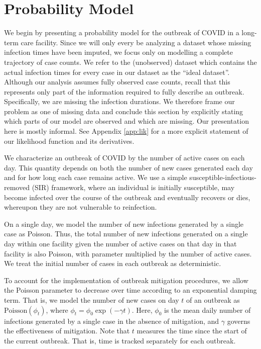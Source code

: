 \documentclass[11pt, oneside]{article}   	%
\begin{document}
\section{Probability Model}
\label{sec:model}


We begin by presenting a probability model for the outbreak of COVID in a long-term care facility. Since we will only every be analyzing a dataset whose missing infection times have been imputed, we focus only on modelling a complete trajectory of case counts. We refer to the (unobserved) dataset which contains the actual infection times for every case in our dataset as the ``ideal dataset''. Although our analysis assumes fully observed case counts, recall that this represents only part of the information required to fully describe an outbreak. Specifically, we are missing the infection durations. We therefore frame our problem as one of missing data and conclude this section by explicitly stating which parts of our model are observed and which are missing. Our presentation here is mostly informal. See Appendix \ref{app:lik} for a more explicit statement of our likelihood function and its derivatives.

We characterize an outbreak of COVID by the number of active cases on each day. This quantity depends on both the number of new cases generated each day and for how long each case remains active. We use a simple susceptible-infectious-removed (SIR) framework, where an individual is initially susceptible, may become infected over the course of the outbreak and eventually recovers or dies, whereupon they are not vulnerable to reinfection. 

On a single day, we model the number of new infections generated by a single case as Poisson. Thus, the total number of new infections generated on a single day within one facility given the number of active cases on that day in that facility is also Poisson, with parameter multiplied by the number of active cases. We treat the initial number of cases in each outbreak as deterministic.

To account for the implementation of outbreak mitigation procedures, we allow the Poisson parameter to decrease over time according to an exponential damping term. That is, we model the number of new cases on day $t$ of an outbreak as $\mathrm{Poisson}(\phi_t)$, where $\phi_t = \phi_0 \exp (-\gamma t)$. Here, $\phi_0$ is the mean daily number of infections generated by a single case in the absence of mitigation, and $\gamma$ governs the effectiveness of mitigation. Note that $t$ measures the time since the start of the current outbreak. That is, time is tracked separately for each outbreak. 
\end{document}
